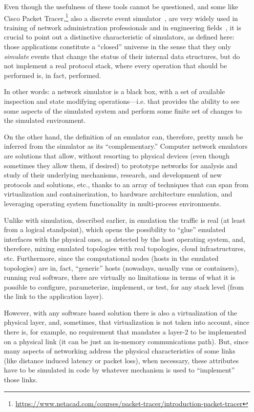 Even though the usefulness of these tools cannot be questioned, and some like Cisco Packet Tracer,\footnote{\url{https://www.netacad.com/courses/packet-tracer/introduction-packet-tracer}} also a discrete event simulator~\cite{evaluatingnetsimmethodologicapproach}, are very widely used in training of network administration professionals and in engineering fields~\cite{rolepackettracer}, it is crucial to point out a distinctive characteristic of simulators, as defined here: those applications constitute a ``closed'' universe in the sense that they only \emph{simulate} events that change the status of their internal data structures, but do not implement a real protocol stack, where every operation that should be performed is, in fact, performed.

In other words: a network simulator is a black box, with a set of available inspection and state modifying operations---i.e. that provides the ability to see some aspects of the simulated system and perform some finite set of changes to the simulated environment.

On the other hand, the definition of an emulator can, therefore, pretty much be inferred from the simulator as its ``complementary.''
Computer network emulators are solutions that allow, without resorting to physical devices (even though sometimes they allow them, if desired) to prototype networks for analysis and study of their underlying mechanisms, research, and development of new protocols and solutions, etc., thanks to an array of techniques that can span from virtualization and containerization, to hardware architecture emulation, and leveraging operating system functionality in multi-process environments.

Unlike with simulation, described earlier, in emulation the traffic is real (at least from a logical standpoint), which opens the possibility to ``glue'' emulated interfaces with the physical ones, as detected by the host operating system, and, therefore, mixing emulated topologies with real topologies, cloud infrastructures, etc.
Furthermore, since the computational nodes (hosts in the emulated topologies) are in, fact, ``generic'' hosts (nowadays, usually \glspl{vm} or containers), running real software, there are virtually no limitations in terms of what it is possible to configure, parameterize, implement, or test, for any stack level (from the link to the application layer).

However, with any software based solution there is also a virtualization of the physical layer, and, sometimes, that virtualization is not taken into account, since there is, for example, no requirement that mandates a layer-2 to be implemented on a physical link (it can be just an in-memory communications path).
But, since many aspects of networking address the physical characteristics of some links (like distance induced latency or packet loss), when necessary, these attributes have to be simulated in code by whatever mechanism is used to ``implement'' those links.

